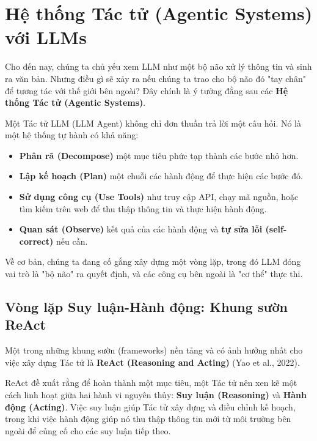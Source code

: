 
\section{Hệ thống Tác tử (Agentic Systems) với LLMs}
\label{sec:agentic_systems}

Cho đến nay, chúng ta chủ yếu xem LLM như một bộ não xử lý thông tin và sinh ra văn bản. Nhưng điều gì sẽ xảy ra nếu chúng ta trao cho bộ não đó "tay chân" để tương tác với thế giới bên ngoài? Đây chính là ý tưởng đằng sau các \textbf{Hệ thống Tác tử (Agentic Systems)}.

Một Tác tử LLM (LLM Agent) không chỉ đơn thuần trả lời một câu hỏi. Nó là một hệ thống tự hành có khả năng:
\begin{itemize}
    \item \textbf{Phân rã (Decompose)} một mục tiêu phức tạp thành các bước nhỏ hơn.
    \item \textbf{Lập kế hoạch (Plan)} một chuỗi các hành động để thực hiện các bước đó.
    \item \textbf{Sử dụng công cụ (Use Tools)} như truy cập API, chạy mã nguồn, hoặc tìm kiếm trên web để thu thập thông tin và thực hiện hành động.
    \item \textbf{Quan sát (Observe)} kết quả của các hành động và \textbf{tự sửa lỗi (self-correct)} nếu cần.
\end{itemize}

Về cơ bản, chúng ta đang cố gắng xây dựng một vòng lặp, trong đó LLM đóng vai trò là "bộ não" ra quyết định, và các công cụ bên ngoài là "cơ thể" thực thi.

\subsection{Vòng lặp Suy luận-Hành động: Khung sườn ReAct}
\label{ssec:react_framework}

Một trong những khung sườn (frameworks) nền tảng và có ảnh hưởng nhất cho việc xây dựng Tác tử là \textbf{ReAct (Reasoning and Acting)} (Yao et al., 2022).

\begin{tcolorbox}[
    title=Triết lý của ReAct,
    colback=green!5!white, colframe=green!60!black, fonttitle=\bfseries
]
ReAct đề xuất rằng để hoàn thành một mục tiêu, một Tác tử nên xen kẽ một cách linh hoạt giữa hai hành vi nguyên thủy: \textbf{Suy luận (Reasoning)} và \textbf{Hành động (Acting)}. Việc suy luận giúp Tác tử xây dựng và điều chỉnh kế hoạch, trong khi việc hành động giúp nó thu thập thông tin mới từ môi trường bên ngoài để củng cố cho các suy luận tiếp theo.
\end{tcolorbox}

